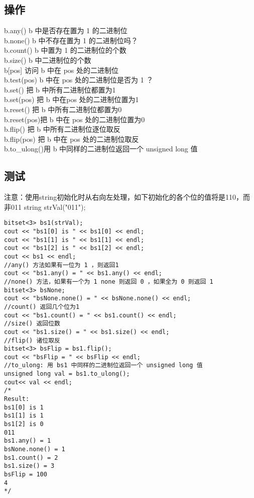 \subsection{操作}
b.any()    \qquad  \qquad        b 中是否存在置为 1 的二进制位 \\
b.none()    \qquad  \qquad      b 中不存在置为 1 的二进制位吗？ \\
b.count()    \qquad  \qquad     b 中置为 1 的二进制位的个数 \\
b.size()    \qquad  \qquad      b 中二进制位的个数 \\
b[pos]      \qquad  \qquad      访问 b 中在 pos 处的二进制位 \\
b.test(pos) \qquad  \qquad      b 中在 pos 处的二进制位是否为 1 ？ \\
b.set()     \qquad  \qquad      把 b 中所有二进制位都置为1  \\
b.set(pos)  \qquad  \qquad      把 b 中在pos 处的二进制位置为1 \\
b.reset()   \qquad  \qquad      把 b 中所有二进制位都置为0 \\
b.reset(pos)\qquad  \qquad      把 b 中在 pos 处的二进制位置为0 \\
b.flip()    \qquad  \qquad      把 b 中所有二进制位逐位取反 \\
b.flip(pos)  \qquad  \qquad     把 b 中在 pos 处的二进制位取反 \\
b.to\_ulong()\qquad  \qquad      用 b 中同样的二进制位返回一个 unsigned long 值 \\

\subsection{测试}


注意：使用string初始化时从右向左处理，如下初始化的各个位的值将是110，而非011 string strVal("011");
\begin{lstlisting}
bitset<3> bs1(strVal);
cout << "bs1[0] is " << bs1[0] << endl;
cout << "bs1[1] is " << bs1[1] << endl;
cout << "bs1[2] is " << bs1[2] << endl;
cout << bs1 << endl;
//any() 方法如果有一位为 1 ，则返回1
cout << "bs1.any() = " << bs1.any() << endl;
//none() 方法，如果有一个为 1 none 则返回 0 ，如果全为 0 则返回 1
bitset<3> bsNone;
cout << "bsNone.none() = " << bsNone.none() << endl;
//count() 返回几个位为1
cout << "bs1.count() = " << bs1.count() << endl;
//size() 返回位数
cout << "bs1.size() = " << bs1.size() << endl;
//flip() 诸位取反
bitset<3> bsFlip = bs1.flip();
cout << "bsFlip = " << bsFlip << endl;
//to_ulong: 用 bs1 中同样的二进制位返回一个 unsigned long 值
unsigned long val = bs1.to_ulong();
cout<< val << endl;
/*
Result:
bs1[0] is 1
bs1[1] is 1
bs1[2] is 0
011
bs1.any() = 1
bsNone.none() = 1
bs1.count() = 2
bs1.size() = 3
bsFlip = 100
4
*/
\end{lstlisting}

